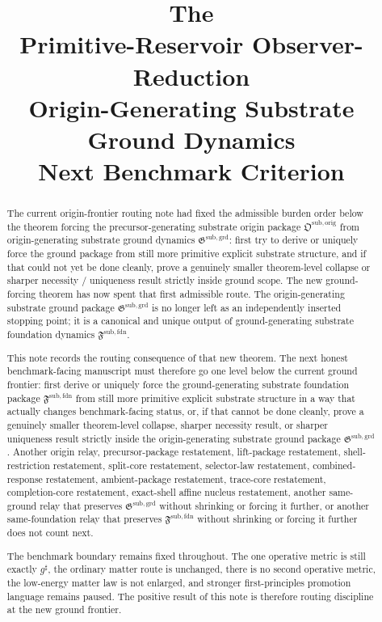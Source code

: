 \documentclass[11pt]{article}
\title{\textbf{The \TheoryName{}}\\[0.4em]
\large Primitive-Reservoir Observer-Reduction\\
\large Origin-Generating Substrate Ground Dynamics\\
\large Next Benchmark Criterion}
\author{}
\date{}
\newcommand{\CompletedMetric}{g^{\sharp}}
\newcommand{\OriginPackage}{\mathfrak O^{\mathrm{sub,orig}}}
\newcommand{\GroundPackage}{\mathfrak G^{\mathrm{sub,grd}}}
\newcommand{\FoundationPackage}{\mathfrak F^{\mathrm{sub,fdn}}}
\begin{document}
\maketitle

\begin{abstract}
The current origin-frontier routing note had fixed the admissible burden order below the theorem forcing the precursor-generating substrate origin package \(\OriginPackage\) from origin-generating substrate ground dynamics \(\GroundPackage\): first try to derive or uniquely force the ground package from still more primitive explicit substrate structure, and if that could not yet be done cleanly, prove a genuinely smaller theorem-level collapse or sharper necessity / uniqueness result strictly inside ground scope. The new ground-forcing theorem has now spent that first admissible route. The origin-generating substrate ground package \(\GroundPackage\) is no longer left as an independently inserted stopping point; it is a canonical and unique output of ground-generating substrate foundation dynamics \(\FoundationPackage\).

This note records the routing consequence of that new theorem. The next honest benchmark-facing manuscript must therefore go one level below the current ground frontier: first derive or uniquely force the ground-generating substrate foundation package \(\FoundationPackage\) from still more primitive explicit substrate structure in a way that actually changes benchmark-facing status, or, if that cannot be done cleanly, prove a genuinely smaller theorem-level collapse, sharper necessity result, or sharper uniqueness result strictly inside the origin-generating substrate ground package \(\GroundPackage\). Another origin relay, precursor-package restatement, lift-package restatement, shell-restriction restatement, split-core restatement, selector-law restatement, combined-response restatement, ambient-package restatement, trace-core restatement, completion-core restatement, exact-shell affine nucleus restatement, another same-ground relay that preserves \(\GroundPackage\) without shrinking or forcing it further, or another same-foundation relay that preserves \(\FoundationPackage\) without shrinking or forcing it further does not count next.

The benchmark boundary remains fixed throughout. The one operative metric is still exactly \(\CompletedMetric\), the ordinary matter route is unchanged, there is no second operative metric, the low-energy matter law is not enlarged, and stronger first-principles promotion language remains paused. The positive result of this note is therefore routing discipline at the new ground frontier.
\end{abstract}
\end{document}
